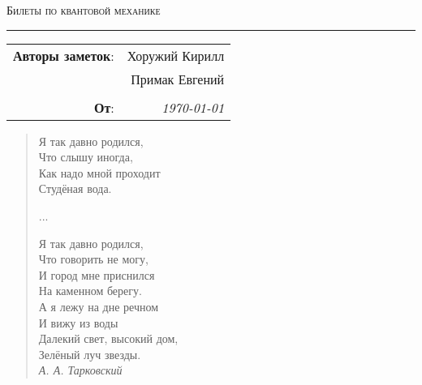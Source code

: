 
\begin{center}
    \LARGE \textsc{Билеты по квантовой механике}
\end{center}

\hrule

\phantom{42}

\begin{flushright}
    \begin{tabular}{rr}
        \textbf{Авторы заметок}: 
        & Хоружий Кирилл \\
        & Примак Евгений \\
        & \\
        \textbf{От}: &
        \textit{\today}\\
    \end{tabular}
\end{flushright}
\thispagestyle{empty}


\phantom{42}

\noindent
\begin{minipage}{0.5\textwidth}
     \begin{quotation}
     \noindent
        Я так давно родился, \\
        Что слышу иногда,  \\
        Как надо мной проходит \\
        Студёная вода. 

        ...

    \noindent
        Я так давно родился,  \\
        Что говорить не могу,  \\
        И город мне приснился  \\
        На каменном берегу.  \\

    \noindent
        А я лежу на дне речном  \\
        И вижу из воды  \\
        Далекий свет, высокий дом,  \\
        Зелёный луч звезды. \\
        \phantom{42} \hfill \textit{А. А. Тарковский}
    \end{quotation}
\end{minipage}


